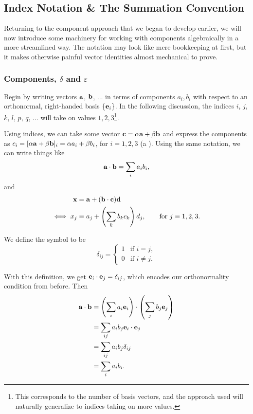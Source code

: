 \documentclass[a4paper]{scrartcl}
\begin{document}
\subsection{Index Notation \& The Summation Convention}

Returning to the component approach that we began to develop earlier, we will now introduce some machinery for working with components algebraically in a more streamlined way. The notation may look like mere bookkeeping at first, but it makes otherwise painful vector identities almost mechanical to prove.

\subsubsection{Components, $\delta$ and $\varepsilon$}

Begin by writing vectors $\mathbf{a}$, $\mathbf{b}$, $\dots$ in terms of components $a_i, b_i$ with respect to an orthonormal, right-handed basis $\{\mathbf{e}_i\}$. In the following discussion, the indices $i$, $j$, $k$, $l$, $p$, $q$, $\dots$ will take on values $1, 2, 3$\footnote{This corresponds to the number of basis vectors, and the approach used will naturally generalize to indices taking on more values.}.

Using indices, we can take some vector $\mathbf{c} = \alpha \mathbf{a} + \beta \mathbf{b}$ and express the components as $c_i = [\alpha \mathbf{a} + \beta \mathbf{b}]_i = \alpha a_i + \beta b_i$, for $i = 1, 2, 3$ (a ). Using the same notation, we can write things like
$$
\mathbf{a} \cdot \mathbf{b} = \sum_i a_i b_i,
$$
and
\begin{align*}
    \mathbf{x} &= \mathbf{a} + (\mathbf{b} \cdot \mathbf{c}) \mathbf{d} \\
\iff x_j &= a_j + \left(\sum_k b_k c_k\right) d_j, \quad \quad \text{for }j = 1, 2, 3.
\end{align*}

\begin{definition}
    We define the  symbol to be
    $$
    \delta_{ij} = \begin{cases}
        1 &\mbox{if } i = j, \\
        0 &\mbox{if } i \neq j.
       \end{cases}
    $$
\end{definition}

With this definition, we get $\mathbf{e}_i \cdot \mathbf{e}_j = \delta_{ij}$, which encodes our orthonormality condition from before. Then
\begin{align*}
    \mathbf{a} \cdot \mathbf{b} &= \left(\sum_i a_i \mathbf{e}_i\right)\cdot\left(\sum_j b_j \mathbf{e}_j\right) \\
    &= \sum_{ij} a_i b_j \mathbf{e}_i \cdot \mathbf{e}_j \\
    &= \sum_{ij} a_i b_j \delta_{ij} \\
    &= \sum_i a_i b_i.
\end{align*}
\end{document}

